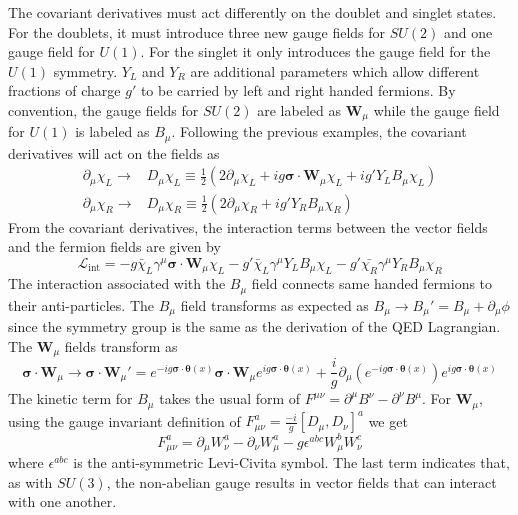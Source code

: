 The covariant derivatives must act differently on the doublet and singlet states. For the doublets, it must introduce three new gauge fields for $SU(2)$ and one gauge field for $U(1)$. For the singlet it only introduces the gauge field for the $U(1)$ symmetry. $Y_L$ and $Y_R$ are additional parameters which allow different fractions of charge $g'$ to be carried by left and right handed fermions. By convention, the gauge fields for $SU(2)$ are labeled as $\mathbf{W}_\mu$ while the gauge field for $U(1)$ is labeled as $B_\mu$. Following the previous examples, the covariant derivatives will act on the fields as
\begin{align}
	\label{eq:ew_cov_derivative}
	\partial_\mu\chi_L\to&D_\mu\chi_L\equiv\frac{1}{2}\left(2\partial_\mu\chi_L+ig\boldsymbol{\sigma}\cdot\mathbf{W}_\mu\chi_L+ig'Y_{L}B_\mu\chi_L\right)\\
	\partial_\mu\chi_R\to&D_\mu\chi_R\equiv\frac{1}{2}\left(2\partial_\mu\chi_R+ig'Y_{R}B_\mu\chi_R\right)
\end{align}
From the covariant derivatives, the interaction terms between the vector fields and the fermion fields are given by
\begin{equation}
	\label{eq:ew_interaction}
	\mathcal{L}_\text{int}=-g\bar{\chi}_L\gamma^\mu\boldsymbol{\sigma}\cdot\mathbf{W}_\mu\chi_L-g'\bar{\chi}_L\gamma^\mu Y_{L}B_\mu\chi_L-g'\bar{\chi_R}\gamma^\mu Y_{R} B_\mu\chi_R
\end{equation}
The interaction associated with the $B_\mu$ field connects same handed fermions to their anti-particles. The $B_\mu$ field transforms as expected as $B_\mu\to B_\mu'=B_\mu+\partial_\mu\phi$ since the symmetry group is the same as the derivation of the QED Lagrangian. The $\mathbf{W}_\mu$ fields transform as
\begin{equation}
	\boldsymbol{\sigma}\cdot\mathbf{W}_\mu\to\boldsymbol{\sigma}\cdot\mathbf{W}_\mu'=e^{-ig\boldsymbol{\sigma}\cdot\boldsymbol{\theta}(x)}\boldsymbol{\sigma}\cdot\mathbf{W}_\mu e^{ig\boldsymbol{\sigma}\cdot\boldsymbol{\theta}(x)}+\frac{i}{g}\partial_\mu\left(e^{-ig\boldsymbol{\sigma}\cdot\boldsymbol{\theta}(x)}\right)e^{ig\boldsymbol{\sigma}\cdot\boldsymbol{\theta}(x)}
\end{equation}
The kinetic term for $B_\mu$ takes the usual form of $F^{\mu\nu}=\partial^\mu B^\nu-\partial^\nu B^\mu$. For $\mathbf{W}_\mu$, using the gauge invariant definition of $F^{a}_{\mu\nu}=\frac{-i}{g}[D_\mu,D_\nu]^a$ we get
\begin{equation}
	F^{a}_{\mu\nu}=\partial_\mu W_\nu^a-\partial_\nu W_\mu^a-g\epsilon^{abc}W_\mu^bW_\nu^c
\end{equation}
where $\epsilon^{abc}$ is the anti-symmetric Levi-Civita symbol. The last term indicates that, as with $SU(3)$, the non-abelian gauge results in vector fields that can interact with one another.

